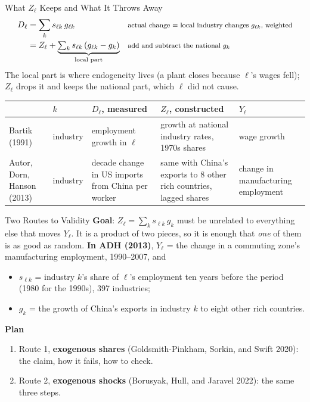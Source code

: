 \documentclass[aspectratio=169,11pt,xcolor=dvipsnames]{beamer}
\newcommand{\srcp}[1]{{\scriptsize\color{gray}(#1)}}
\begin{document}
\begin{frame}{What $Z_\ell$ Keeps and What It Throws Away}
\vskip-10pt
\begin{align*}
  D_\ell &= \sum_k s_{\ell k}\, g_{\ell k}
     && \text{\footnotesize actual change = local industry changes $g_{\ell k}$, weighted} \\
  &= Z_\ell + \underbrace{\textstyle\sum_k s_{\ell k}\,(g_{\ell k} - g_k)}_{\text{local part}}
     && \text{\footnotesize add and subtract the national $g_k$}
\end{align*}
\vskip-6pt
The local part is where endogeneity lives (a plant closes because $\ell$'s
wages fell); $Z_\ell$ drops it and keeps the national part, which $\ell$ did not cause.
\vskip-4pt
\begin{center}\scriptsize
\renewcommand{\arraystretch}{1.0}
\begin{tabular}{@{}>{\raggedright\arraybackslash}p{2.1cm}>{\raggedright\arraybackslash}p{1.3cm}>{\raggedright\arraybackslash}p{2.6cm}>{\raggedright\arraybackslash}p{3.6cm}>{\raggedright\arraybackslash}p{1.9cm}@{}}
\toprule
 & $k$ & $D_\ell$, measured & $Z_\ell$, constructed & $Y_\ell$ \\
\midrule
Bartik (1991) & industry & employment growth in $\ell$ & growth at national industry rates, 1970s shares & wage growth \\
Autor, Dorn, Hanson (2013) & industry & decade change in US imports from China per worker & same with China's exports to 8 other rich countries, lagged shares & change in manufacturing employment \\
\bottomrule
\end{tabular}
\end{center}
\end{frame}

\begin{frame}{Two Routes to Validity}
\textbf{Goal}: $Z_\ell = \sum_k s_{\ell k}\, g_k$ must be unrelated to everything
else that moves $Y_\ell$. It is a product of two pieces, so it is enough that
\emph{one} of them is as good as random.
\vskip2pt
\textbf{In ADH (2013)}, $Y_\ell$ = the change in a commuting zone's
manufacturing employment, 1990--2007, and
\begin{itemize}\itemsep1pt
  \item $s_{\ell k}$ = industry $k$'s share of $\ell$'s employment ten years
        before the period (1980 for the 1990s), 397 industries;
  \item $g_k$ = the growth of China's exports in industry $k$ to eight other
        rich countries.
\end{itemize}
\textbf{Plan}
\begin{enumerate}\itemsep1pt
  \item Route 1, \textbf{exogenous shares} \srcp{Goldsmith-Pinkham, Sorkin,
        and Swift 2020}: the claim, how it fails, how to check.
  \item Route 2, \textbf{exogenous shocks} \srcp{Borusyak, Hull, and Jaravel
        2022}: the same three steps.
\end{enumerate}
\end{frame}
\end{document}
